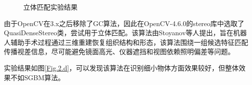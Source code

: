 \documentclass[10.5pt, a4paper]{article}
\begin{document}
\begin{figure}[H]
\centering  %
\caption{立体匹配实验结果}
\label{Fig.2}
\end{figure}
由于OpenCV在3.x之后移除了GC算法，因此在OpenCV-4.6.0的stereo库中选取了QuasiDenseStereo类，尝试用于立体匹配。该算法由Stoyanov等人\cite{quasi}提出，旨在机器人辅助手术过程通过三维重建恢复组织结构和形态，该算法围绕一组候选特征匹配传播视差信息，尽可能避免镜面高光、仪器遮挡和视图依赖照明偏差等问题。

实验结果如图\ref{Fig.2.d}，可以发现该算法在识别细小物体方面效果较好，但整体效果不如SGBM算法。

\end{document}
